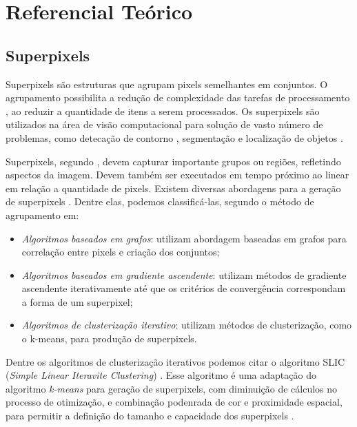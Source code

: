 \begin{document}
\section{Referencial Teórico} \label{sec:ref_teorico}


\subsection{Superpixels} \label{ssec:superpixels}

Superpixels são estruturas que agrupam pixels semelhantes em conjuntos. O agrupamento possibilita a redução de complexidade das tarefas de processamento \cite{SLIC}, ao reduzir a quantidade de itens a serem processados. Os superpixels são utilizados na área de visão computacional para solução de vasto número de problemas, como detecação de contorno \cite{CONTOUR}, segmentação \cite{SEG_MERGE} e localização de objetos \cite{SEG_LOCALIZ}.

Superpixels, segundo \cite{FELZENSWALB}, devem capturar importante grupos ou regiões, refletindo aspectos da imagem. Devem também ser executados em tempo próximo ao linear em relação a quantidade de pixels. Existem diversas abordagens para a geração de superpixels \cite{SLIC}. Dentre elas, podemos classificá-las, segundo o método de agrupamento em: 

\begin{itemize}
 \item \textit{Algoritmos baseados em grafos}: utilizam abordagem baseadas em grafos para correlação entre pixels e criação dos conjuntos;
 \item \textit{Algoritmos baseados em gradiente ascendente}: utilizam métodos de gradiente ascendente iterativamente até que os critérios de convergência correspondam a forma de um superpixel; 
 \item \textit{Algoritmos de clusterização iterativo}: utilizam métodos de clusterização, como o k-means, para produção de superpixels.
\end{itemize}

Dentre os algoritmos de clusterização iterativos podemos citar o algoritmo SLIC (\textit{Simple Linear Iteravite Clustering}) \cite{SLIC}. Esse algoritmo é uma adaptação do algoritmo \textit{k-means} para geração de superpixels, com diminuição de cálculos no processo de otimização, e combinação podenrada de cor e proximidade espacial, para permitir a definição do tamanho e capacidade dos superpixels \cite{SLIC}.
\end{document}
